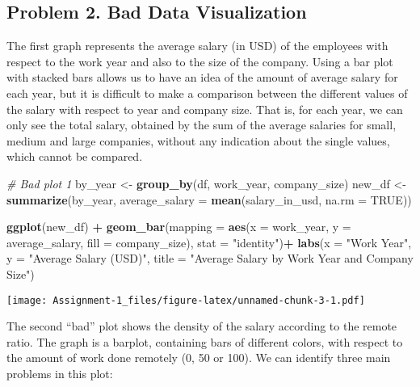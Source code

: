 \documentclass[
]{article}
\newenvironment{Shaded}{\begin{snugshade}}{\end{snugshade}}
\newcommand{\AttributeTok}[1]{\textcolor[rgb]{0.13,0.29,0.53}{#1}}
\newcommand{\CommentTok}[1]{\textcolor[rgb]{0.56,0.35,0.01}{\textit{#1}}}
\newcommand{\ConstantTok}[1]{\textcolor[rgb]{0.56,0.35,0.01}{#1}}
\newcommand{\FunctionTok}[1]{\textcolor[rgb]{0.13,0.29,0.53}{\textbf{#1}}}
\newcommand{\NormalTok}[1]{#1}
\newcommand{\OtherTok}[1]{\textcolor[rgb]{0.56,0.35,0.01}{#1}}
\newcommand{\SpecialCharTok}[1]{\textcolor[rgb]{0.81,0.36,0.00}{\textbf{#1}}}
\newcommand{\StringTok}[1]{\textcolor[rgb]{0.31,0.60,0.02}{#1}}
\begin{document}
\hypertarget{problem-2.-bad-data-visualization}{%
\subsection{Problem 2. Bad Data
Visualization}\label{problem-2.-bad-data-visualization}}

The first graph represents the average salary (in USD) of the employees
with respect to the work year and also to the size of the company. Using
a bar plot with stacked bars allows us to have an idea of the amount of
average salary for each year, but it is difficult to make a comparison
between the different values of the salary with respect to year and
company size. That is, for each year, we can only see the total salary,
obtained by the sum of the average salaries for small, medium and large
companies, without any indication about the single values, which cannot
be compared. \newline

\begin{Shaded}
\begin{Highlighting}[]
\CommentTok{\# Bad plot 1}
\NormalTok{by\_year }\OtherTok{\textless{}{-}} \FunctionTok{group\_by}\NormalTok{(df, work\_year, company\_size)}
\NormalTok{new\_df }\OtherTok{\textless{}{-}} \FunctionTok{summarize}\NormalTok{(by\_year, }\AttributeTok{average\_salary =} \FunctionTok{mean}\NormalTok{(salary\_in\_usd, }\AttributeTok{na.rm =} \ConstantTok{TRUE}\NormalTok{))}

\FunctionTok{ggplot}\NormalTok{(new\_df) }\SpecialCharTok{+}
  \FunctionTok{geom\_bar}\NormalTok{(}\AttributeTok{mapping =} \FunctionTok{aes}\NormalTok{(}\AttributeTok{x =}\NormalTok{ work\_year, }\AttributeTok{y =}\NormalTok{ average\_salary, }\AttributeTok{fill =}\NormalTok{ company\_size), }\AttributeTok{stat =} \StringTok{"identity"}\NormalTok{)}\SpecialCharTok{+}
  \FunctionTok{labs}\NormalTok{(}\AttributeTok{x =} \StringTok{"Work Year"}\NormalTok{, }\AttributeTok{y =} \StringTok{"Average Salary (USD)"}\NormalTok{, }\AttributeTok{title =} \StringTok{"Average Salary by Work Year and Company Size"}\NormalTok{)}
\end{Highlighting}
\end{Shaded}

\texttt{[image: Assignment-1\_files/figure-latex/unnamed-chunk-3-1.pdf]}

The second ``bad'' plot shows the density of the salary according to the
remote ratio. The graph is a barplot, containing bars of different
colors, with respect to the amount of work done remotely (0, 50 or 100).
We can identify three main problems in this plot:
\end{document}
